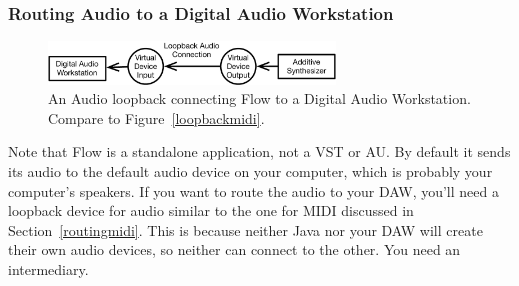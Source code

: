 \documentclass{article}
\newcommand\name{Flow}
\begin{document}
\subsubsection{Routing Audio to a Digital Audio Workstation}
\label{audioloopback}

\begin{figure}
\vspace{-3em}
\begin{center}\vspace{-2em}\includegraphics[width=3in]{loopbackaudio}\end{center}
\vspace{-1em}
\caption{An Audio loopback connecting {\name} to a Digital Audio Workstation.  Compare to Figure~\ref{loopbackmidi}.}\label{loopbackaudio}
\end{figure}

Note that {\name} is a standalone application, not a VST or AU.  By default it sends its audio to the default audio device on your computer, which is probably your computer's speakers.  If you want to route the audio to your DAW, you'll need a loopback device for audio similar to the one for MIDI discussed in Section~\ref{routingmidi}.  This is because neither Java nor your DAW will create their own audio devices, so neither can connect to the other.  You need an intermediary.
\end{document}
